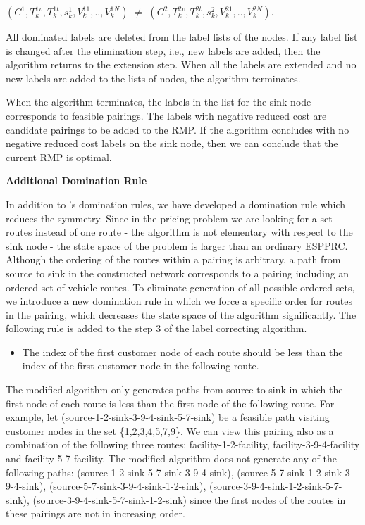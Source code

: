 \begin{enumerate}
\begin{itemize}
    $(C^1,T_k^{1v},T_k^{1t},s_k^1,V_k^{11},..,V_k^{1N})$ $\neq$ 
    $(C^2,T_k^{2v},T_k^{2t},s_k^2,V_k^{21},..,V_k^{2N})$.
  \end{itemize}
   All dominated labels are deleted from the label lists of the nodes. If any label list is changed
   after the elimination step, i.e., new labels are added, then the algorithm returns to the extension 
   step. When all the labels are extended and no new labels are added to the lists of nodes, the 
   algorithm terminates. 
\end{enumerate}
When the algorithm terminates, the labels in the list for the sink node corresponds to feasible pairings.
The labels with negative reduced cost are candidate pairings to be added to the RMP. If the algorithm 
concludes with no negative reduced cost labels on the sink node, then we can 
conclude that the current RMP is optimal. 

{\bf Additional Domination Rule}

In addition to \citet{Feillet}'s domination rules, we have developed
a domination rule which reduces the symmetry. Since in the pricing problem we are 
looking for a set routes instead of one route  - the algorithm is
not elementary with respect to the sink node - the state space of the problem is
larger than an ordinary ESPPRC. Although the ordering of the routes within a pairing
is arbitrary, a path from source to sink in the constructed network corresponds to 
a pairing including an ordered set of vehicle routes. To eliminate generation of all 
possible ordered sets, we introduce a new domination rule in which we force a specific 
order for routes in the pairing, which decreases the state space of the algorithm 
significantly. The following rule is added to the step 3 of the label correcting 
algorithm.
\begin{itemize}
\item [{\bf Rule}] The index of the first customer node of each route should be less 
than the index of the first customer node in the following route.
\end{itemize}
The modified algorithm only generates paths 
from source to sink in which the first node of each route is less than the first node 
of the following route. 
For example, let (source-1-2-sink-3-9-4-sink-5-7-sink) be a 
feasible path visiting customer nodes in the set \{1,2,3,4,5,7,9\}. We can view this 
pairing also as a combination of the following three routes: facility-1-2-facility, 
facility-3-9-4-facility and facility-5-7-facility. The modified algorithm does not 
generate any of the following paths: (source-1-2-sink-5-7-sink-3-9-4-sink), 
(source-5-7-sink-1-2-sink-3-9-4-sink), (source-5-7-sink-3-9-4-sink-1-2-sink),
 (source-3-9-4-sink-1-2-sink-5-7-sink),  (source-3-9-4-sink-5-7-sink-1-2-sink)
since the first nodes of the routes in these pairings are not in increasing order. 


